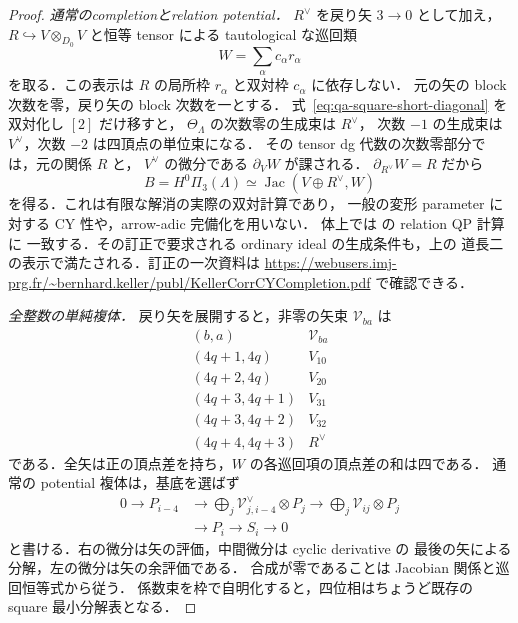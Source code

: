 \begin{proof}
\emph{通常のcompletionとrelation potential．}
$R^\vee$ を戻り矢 $3\to0$ として加え，
$R\hookrightarrow V\otimes_{D_0}V$ と恒等 tensor による
tautological な巡回類
\[
 W=\sum_\alpha c_\alpha r_\alpha
 \tag{RP}\label{eq:qa-square-relative-relation-potential}
\]
を取る．この表示は $R$ の局所枠 $r_\alpha$ と双対枠 $c_\alpha$ に依存しない．
元の矢の block 次数を零，戻り矢の block 次数を一とする．
式~\eqref{eq:qa-square-short-diagonal} を双対化し $[2]$ だけ移すと，
$\Theta_\Lambda$ の次数零の生成束は $R^\vee$，
次数 $-1$ の生成束は $V^\vee$，次数 $-2$ は四頂点の単位束になる．
その tensor dg 代数の次数零部分では，元の関係 $R$ と，
$V^\vee$ の微分である $\partial_VW$ が課される．
$\partial_{R^\vee}W=R$ だから
\[
 B=H^0\Pi_3(\Lambda)
   \simeq \operatorname{Jac}(V\oplus R^\vee,W)
 \tag{RJ}\label{eq:qa-square-relative-jacobian}
\]
を得る．これは有限な解消の実際の双対計算であり，
一般の変形 parameter に対する CY 性や，arrow-adic 完備化を用いない．
体上では \cite[Theorem 6.10]{KellerDeformedCY2011} の relation QP 計算に
一致する．その訂正で要求される ordinary ideal の生成条件も，上の
道長二の表示で満たされる．訂正の一次資料は
\url{https://webusers.imj-prg.fr/~bernhard.keller/publ/KellerCorrCYCompletion.pdf}
で確認できる．

\emph{全整数の単純複体．}
戻り矢を展開すると，非零の矢束 $\mathcal V_{ba}$ は
\[
\begin{array}{c|c}
 (b,a)&\mathcal V_{ba}\\\hline
 (4q+1,4q)&V_{10}\\
 (4q+2,4q)&V_{20}\\
 (4q+3,4q+1)&V_{31}\\
 (4q+3,4q+2)&V_{32}\\
 (4q+4,4q+3)&R^\vee
\end{array}
\]
である．全矢は正の頂点差を持ち，$W$ の各巡回項の頂点差の和は四である．
通常の potential 複体は，基底を選ばず
\[
\begin{split}
0\longrightarrow P_{i-4}
 &\longrightarrow\bigoplus_j\mathcal V_{j,i-4}^{\vee}\otimes P_j
 \longrightarrow\bigoplus_j\mathcal V_{ij}\otimes P_j\\
 &\longrightarrow P_i\longrightarrow S_i\longrightarrow0
\end{split}
\tag{SR}\label{eq:qa-square-relative-simple-resolution}
\]
と書ける．右の微分は矢の評価，中間微分は cyclic derivative の
最後の矢による分解，左の微分は矢の余評価である．
合成が零であることは Jacobian 関係と巡回恒等式から従う．
係数束を枠で自明化すると，四位相はちょうど既存の square 最小分解表となる．


\end{proof}
